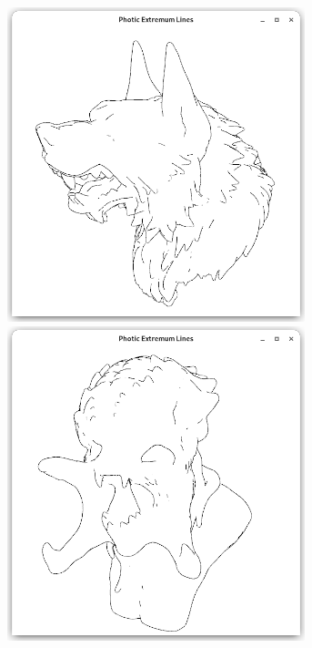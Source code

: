 \documentclass[9pt,fleqn,twoside,twocolumn]{stdglobal}
\begin{document}
\begin{figure}
\begin{subfigure}[t]{0.19\textwidth}
        \includegraphics[width=0.95\textwidth,trim={15px 15 15 50},clip]{images/results/werewolf-contours.png}
        \includegraphics[width=0.95\textwidth,trim={15px 15 15 50},clip]{images/results/predator-contours.png}

\end{subfigure}
\end{figure}
\end{document}
